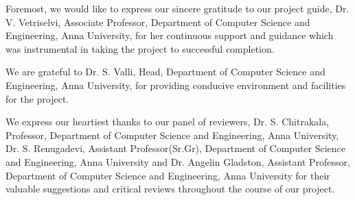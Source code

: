 Foremost, we would like to express our sincere gratitude to our
project guide, Dr. V. Vetriselvi, Associate Professor, Department of
Computer Science and Engineering, Anna University, for her continuous
support and guidance which was instrumental in taking the project to
successful completion.

We are grateful to Dr. S. Valli, Head, Department of Computer
Science and Engineering, Anna University, for providing conducive environment
and facilities for the project.

We express our heartiest thanks to our panel of reviewers, Dr. S.
Chitrakala, Professor, Department of Computer Science and Engineering,
Anna University, Dr. S. Renugadevi, Assistant Professor(Sr.Gr), Department
of Computer Science and Engineering, Anna University and Dr. Angelin Gladston, Assistant Professor, Department of Computer Science and
Engineering, Anna University for their valuable suggestions and critical
reviews throughout the course of our project.
